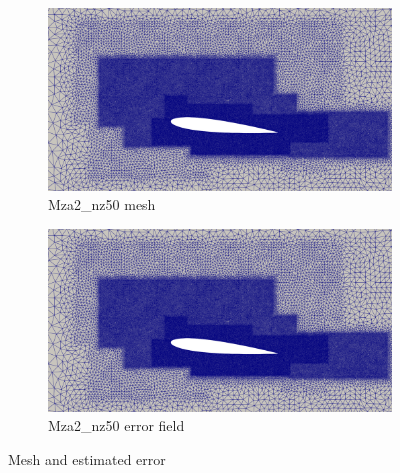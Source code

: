 \begin{figure}[H]
	
	\begin{subfigure}[b]{0.475\textwidth}
		\centering
		\includegraphics[width=1\textwidth]{figures/zonal_adapt_results/Mesh_and_error_plots_Re200k/Mza2_inplane.png}
		\caption{Mza2\_nz50 mesh}
		\label{fig:zonal_Mza2_mesh_Re200k}
	\end{subfigure}
	\begin{subfigure}[b]{0.475\textwidth}
		\centering
		\includegraphics[width=1\textwidth]{figures/zonal_adapt_results/Mesh_and_error_plots_Re200k/Mza2_inplane.png}
		\caption{Mza2\_nz50 error field}
		\label{fig:zonal_Mza2_error_Re200k}
	\end{subfigure}
	
	\caption{Mesh and estimated error}
\end{figure}